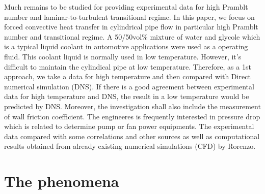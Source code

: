 \documentclass[conference]{IEEEtran}
\begin{document}
Much remains to be studied for providing experimental data for high Pramblt number and laminar-to-turbulent transitional regime.
In this paper, we focus on forced convective heat transfer in cylindrical pipe flow in particular high Pramblt number and transitional regime.
A 50/50vol\% mixture of water and glycole which is a typical liquid coolant in automotive applications were used as a operating fluid.
This coolant liquid is normally used in low temperature.
However, it's difficult to maintain the cylindical pipe at low temperature.
Therefore, as a 1st approach, we take a data for high temperature and then compared with Direct numerical simulation (DNS).
If there is a good agreement between experimental data for high temperature and DNS, the result in a low temperature would be predicted by DNS.
Moreover, the investigation shall also include the measurement of wall friction coefficient.
The engineeres is frequently interested in pressure drop which is related to determine pump or fan power equipments.
The experimental data compared with some correlations and other sources as well as computational results obtained from already existing numerical simulations (CFD) by Rorenzo\cite{Rorenzo2019}.

\section{The phenomena}
%
\end{document}
